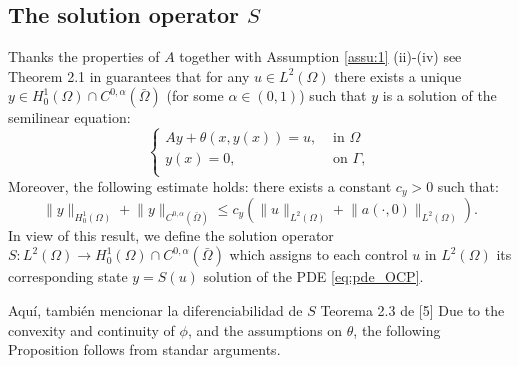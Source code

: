 \documentclass[11pt,a4paper]{amsart}
\renewcommand{\l}{\left}
\renewcommand{\r}{\right}
\newcommand{\om}{\Omega}
\newcommand{\ga}{\Gamma}
\newcommand{\norm}[1]{\lVert #1 \rVert}
\begin{document}
\subsection{The solution operator $S$} 
Thanks the properties of $A$ together with Assumption \ref{assu:1} (ii)-(iv)  see Theorem 2.1 in \cite{casas-trol} guarantees that for any $u\in L^2(\om)$ there exists a unique $y\in H_0^1(\om)\cap C^{0,\alpha}(\bar\om)$ (for some $\alpha\in(0,1)$) such that $y$ is a solution of the semilinear equation:
\begin{equation}\label{eq:pde_OCP}
    \begin{cases}
        Ay + \theta(x,y(x)) = u,  & \text{ in } \om\\
         y(x) =0, & \text{ on } \ga, \\
    \end{cases}
\end{equation}
Moreover, the following estimate holds: there exists a constant $c_y>0$ such that:
 \begin{equation}\label{eq:state_continuity}
\norm{y}_{H_0^1(\om)}+\norm{y}_{C^{0,\alpha}(\bar \om)}\le c_y\l(\norm{u}_{L^2(\om)}+\norm{a(\cdot,0)}_{L^2(\om)}\r).
\end{equation}
In view of this result, we define the solution operator $S:L^2(\om)\to H_0^1(\om)\cap C^{0,\alpha}(\bar\om)$ which assigns to each control $u$ in $L^2(\om)$ its corresponding state $y=S(u)$ solution of the PDE \eqref{eq:pde_OCP}.  

{\color{red} Aquí, también mencionar la diferenciabilidad de $S$ Teorema 2.3 de [5]}
Due to the convexity and continuity of $\phi$, and the assumptions on $\theta$, the following Proposition follows from standar arguments.
 
\end{document}
